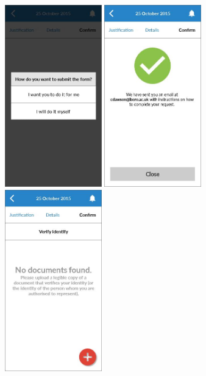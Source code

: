 \begin{figure}
  \subfigures
  \centering
  \begin{minipage}{4.6cm}
    \centering
    \includegraphics[width=4.2cm]{inc/ui_takedown_step7.jpg}
    \caption{}
    \label{fig:ui_takedown_step7}
  \end{minipage}
  \begin{minipage}{4.6cm}
    \centering
    \includegraphics[width=4.2cm]{inc/ui_takedown_step8a.jpg}
    \caption{}
    \label{fig:ui_takedown_step8a}
  \end{minipage}
  \begin{minipage}{4.6cm}
    \centering
    \includegraphics[width=4.2cm]{inc/ui_takedown_step8b.jpg}
    \caption{}
    \label{fig:ui_takedown_step8b}
  \end{minipage}
\end{figure}

